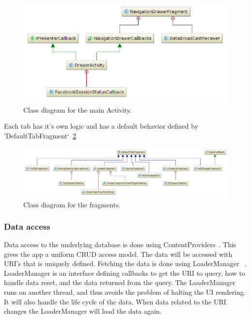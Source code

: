 \begin{figure}[H]
\includegraphics[width=\textwidth]{ch/architecture/fig/class_diagram_drawer.png}
\caption{Class diagram for the main Activity.}
\label{fig:class_diagram_drawer}
\end{figure}

Each tab has it's own logic and has a default behavior defined by 'DefaultTabFragment`~\ref{fig:class_diagram_fragments}

\begin{figure}[H]
\includegraphics[width=\textwidth]{ch/architecture/fig/class_diagram_fragments.png}
\caption{Class diagram for the fragments.}
\label{fig:class_diagram_fragments}
\end{figure}

\subsubsection{Data access}

Data access to the underlying database is done using ContentProviders~\cite{contentproviders}. This gives the app a uniform \gls{CRUD} access model. The data will be accessed with \gls{URI}'s that is uniquely defined. Fetching the data is done using LoaderManager~\cite{loadermanager} . LoaderManager is an interface defining callbacks to get the URI to query, how to handle data reset, and the data returned from the query. The LoaderManager runs on another thread, and thus avoids the problem of halting the UI rendering. It will also handle the life cycle of the data. When data related to the URI changes the LoaderManager will load the data again. 

